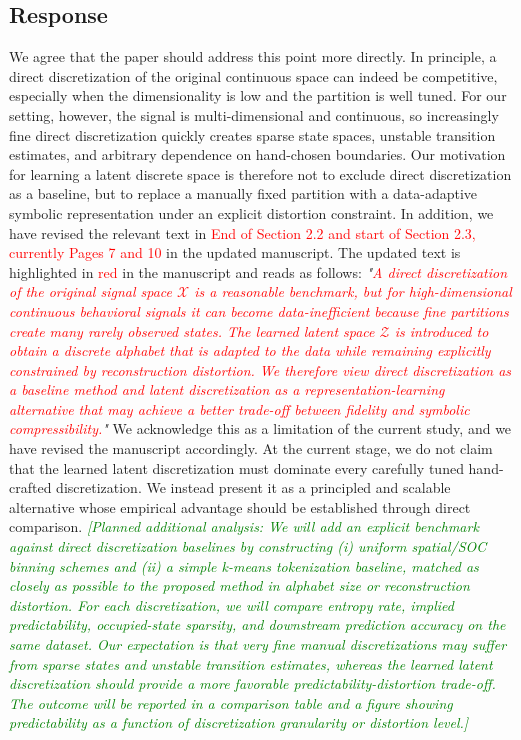 \documentclass{NSF}
\begin{document}
\subsection{Response}
We agree that the paper should address this point more directly. In principle, a direct discretization of the original continuous space can indeed be competitive, especially when the dimensionality is low and the partition is well tuned. For our setting, however, the signal is multi-dimensional and continuous, so increasingly fine direct discretization quickly creates sparse state spaces, unstable transition estimates, and arbitrary dependence on hand-chosen boundaries. Our motivation for learning a latent discrete space is therefore not to exclude direct discretization as a baseline, but to replace a manually fixed partition with a data-adaptive symbolic representation under an explicit distortion constraint.
\noindent In addition, we have revised the relevant text in \textcolor{red}{End of Section 2.2 and start of Section 2.3, currently Pages 7 and 10} in the updated manuscript. The updated text is highlighted in \textcolor{red}{red} in the manuscript and reads as follows:
\vskip 0.1cm
\noindent \textit{"\textcolor{red}{A direct discretization of the original signal space $\mathcal{X}$ is a reasonable benchmark, but for high-dimensional continuous behavioral signals it can become data-inefficient because fine partitions create many rarely observed states. The learned latent space $\mathcal{Z}$ is introduced to obtain a discrete alphabet that is adapted to the data while remaining explicitly constrained by reconstruction distortion. We therefore view direct discretization as a baseline method and latent discretization as a representation-learning alternative that may achieve a better trade-off between fidelity and symbolic compressibility.}"}
\vskip 0.05in
\noindent We acknowledge this as a limitation of the current study, and we have revised the manuscript accordingly. At the current stage, we do not claim that the learned latent discretization must dominate every carefully tuned hand-crafted discretization. We instead present it as a principled and scalable alternative whose empirical advantage should be established through direct comparison.
\vskip 0.05in
\noindent\textcolor{green}{\textit{[Planned additional analysis: We will add an explicit benchmark against direct discretization baselines by constructing (i) uniform spatial/SOC binning schemes and (ii) a simple k-means tokenization baseline, matched as closely as possible to the proposed method in alphabet size or reconstruction distortion. For each discretization, we will compare entropy rate, implied predictability, occupied-state sparsity, and downstream prediction accuracy on the same dataset. Our expectation is that very fine manual discretizations may suffer from sparse states and unstable transition estimates, whereas the learned latent discretization should provide a more favorable predictability-distortion trade-off. The outcome will be reported in a comparison table and a figure showing predictability as a function of discretization granularity or distortion level.]}}
\end{document}
